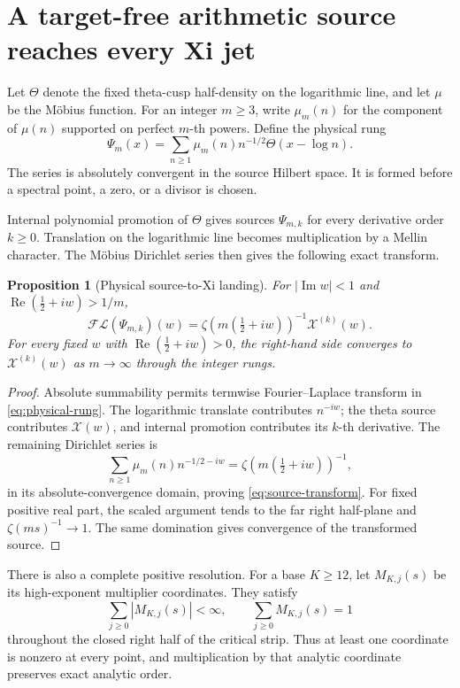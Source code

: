 \documentclass[11pt]{article}
\newtheorem{proposition}[theorem]{Proposition}
\theoremstyle{definition}
\theoremstyle{remark}
\newcommand{\XiC}{\mathcal X}
\newcommand{\Rea}{\operatorname{Re}}
\newcommand{\Ima}{\operatorname{Im}}
\begin{document}
\section{A target-free arithmetic source reaches every Xi jet}

Let \(\Theta\) denote the fixed theta-cusp half-density on the logarithmic
line, and let \(\mu\) be the M\"obius function.  For an integer \(m\geq3\),
write \(\mu_m(n)\) for the component of \(\mu(n)\) supported on perfect
\(m\)-th powers.  Define the physical rung
\[
 \Psi_m(x)=\sum_{n\geq1}\mu_m(n)n^{-1/2}\Theta(x-\log n).
\tag{3.1}\label{eq:physical-rung}
\]
The series is absolutely convergent in the source Hilbert space.  It is
formed before a spectral point, a zero, or a divisor is chosen.

Internal polynomial promotion of \(\Theta\) gives sources
\(\Psi_{m,k}\) for every derivative order \(k\geq0\).  Translation on the
logarithmic line becomes multiplication by a Mellin character.  The M\"obius
Dirichlet series then gives the following exact transform.

\begin{proposition}[Physical source-to-Xi landing]
\label{prop:source-landing}
For \(|\Ima w|<1\) and
\(\Rea(\tfrac12+iw)>1/m\),
\[
 \mathcal{FL}(\Psi_{m,k})(w)
 =\zeta\!\left(m\left(\tfrac12+iw\right)\right)^{-1}
  \XiC^{(k)}(w).
\tag{3.2}\label{eq:source-transform}
\]
For every fixed \(w\) with
\(\Rea(\tfrac12+iw)>0\), the right-hand side converges to
\(\XiC^{(k)}(w)\) as \(m\to\infty\) through the integer rungs.
\end{proposition}

\begin{proof}
Absolute summability permits termwise Fourier--Laplace transform in
\eqref{eq:physical-rung}.  The logarithmic translate contributes
\(n^{-iw}\); the theta source contributes \(\XiC(w)\), and internal
promotion contributes its \(k\)-th derivative.  The remaining Dirichlet
series is
\[
 \sum_{n\geq1}\mu_m(n)n^{-1/2-iw}
 =\zeta\!\left(m\left(\tfrac12+iw\right)\right)^{-1},
\]
in its absolute-convergence domain, proving \eqref{eq:source-transform}.
For fixed positive real part, the scaled argument tends to the far right
half-plane and \(\zeta(ms)^{-1}\to1\).  The same domination gives convergence
of the transformed source.
\end{proof}

There is also a complete positive resolution.  For a base \(K\geq12\), let
\(M_{K,j}(s)\) be its high-exponent multiplier coordinates.  They satisfy
\[
 \sum_{j\geq0}|M_{K,j}(s)|<\infty,
 \qquad
 \sum_{j\geq0}M_{K,j}(s)=1
\tag{3.3}\label{eq:mass-one}
\]
throughout the closed right half of the critical strip.  Thus at least one
coordinate is nonzero at every point, and multiplication by that analytic
coordinate preserves exact analytic order.
\end{document}
